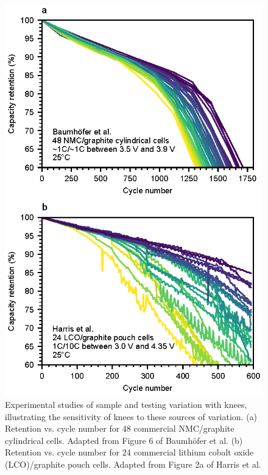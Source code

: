 \documentclass[journal=jpclcd,manuscript=article]{achemso}
\begin{document}
\begin{figure}[ht!]
\centering
\includegraphics[scale=1]{figures/variation_exp.eps}
\caption{Experimental studies of sample and testing variation with knees, illustrating the sensitivity of knees to these sources of variation.
(a) Retention vs. cycle number for 48 commercial NMC/graphite cylindrical cells. Adapted from Figure 6 of Baumhöfer et al. \cite{baumhofer_production_2014}
(b) Retention vs. cycle number for 24 commercial lithium cobalt oxide (LCO)/graphite pouch cells. Adapted from Figure 2a of Harris et al.\cite{harris_failure_2017}
}
\label{fig:var_exp}
\end{figure}
\end{document}
